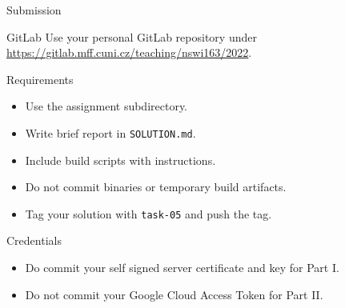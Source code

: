 \begin{frame}{Submission}
    \begin{block}{GitLab}
        Use your personal GitLab repository under \\
        \url{https://gitlab.mff.cuni.cz/teaching/nswi163/2022}.
    \end{block}
    \begin{block}{Requirements}
        \begin{itemize}
            \item Use the assignment subdirectory.
            \item Write brief report in \lstinline{SOLUTION.md}.
            \item Include build scripts with instructions.
            \item Do not commit binaries or temporary build artifacts.
            \item Tag your solution with \lstinline{task-05} and push the tag.
        \end{itemize}
    \end{block}
    \begin{block}{Credentials}
        \begin{itemize}
            \item Do commit your self signed server certificate and key for Part I.
            \item Do not commit your Google Cloud Access Token for Part II.
        \end{itemize}
    \end{block}
\end{frame}



